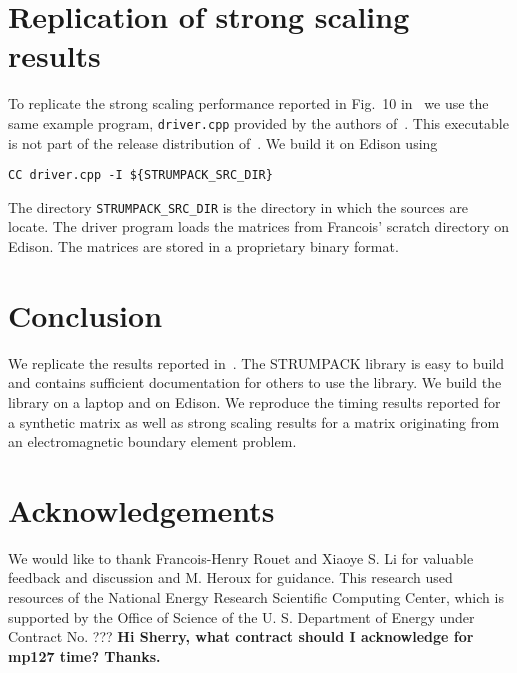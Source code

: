 \documentclass{acmsmall}
\newcommand{\dmcomment}[1]{\textbf{#1}}
\begin{document}
\section{Replication of strong scaling results}

To replicate the strong scaling performance reported in Fig.~10
in~\cite{rouet:strumpack} we use the same example program,
\verb!driver.cpp! provided by the authors
of~\cite{rouet:strumpack}.  This executable is not part of the
release distribution of~\cite{rouet:strumpack}.  We build it on Edison
using
\begin{verbatim}
CC driver.cpp -I ${STRUMPACK_SRC_DIR}
\end{verbatim}
The directory \verb!STRUMPACK_SRC_DIR! is the directory in which
the \strumpack{} sources are locate.  The driver program loads
the matrices from Francois' scratch directory on Edison.  The
matrices are stored in a proprietary binary format.


\section{Conclusion}

We replicate the results reported in~\cite{rouet:strumpack}.  The
STRUMPACK library is easy to build and contains sufficient
documentation for others to use the library.  We build the
library on a laptop and on Edison.  We reproduce the timing
results reported for a synthetic matrix as well as strong scaling
results for a matrix originating from an electromagnetic boundary
element problem.


\section{Acknowledgements}

We would like to thank Francois-Henry Rouet and Xiaoye S. Li for
valuable feedback and discussion and M. Heroux for guidance.
This research used resources of the National Energy Research
Scientific Computing Center, which is supported by the Office of
Science of the U. S. Department of Energy under Contract No. ???
\dmcomment{Hi Sherry, what contract should I acknowledge for
  mp127 time? Thanks.}



\end{document}
